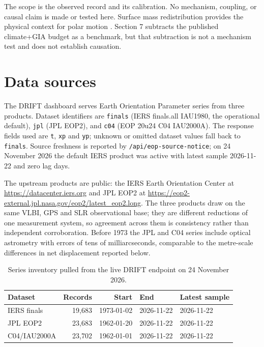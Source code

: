 \documentclass[11pt,a4paper]{article}
\begin{document}
The scope is the observed record and its calibration. No mechanism, coupling, or causal claim is made or tested here. Surface mass redistribution provides the physical context for polar motion \cite{adhikari}. Section 7 subtracts the published climate+GIA budget as a benchmark, but that subtraction is not a mechanism test and does not establish causation.

\section{Data sources}

The DRIFT dashboard serves Earth Orientation Parameter series from three products. Dataset identifiers are \texttt{finals} (IERS finals.all IAU1980, the operational default), \texttt{jpl} (JPL EOP2), and \texttt{c04} (EOP 20u24 C04 IAU2000A). The response fields used are \texttt{t}, \texttt{xp} and \texttt{yp}; unknown or omitted dataset values fall back to \texttt{finals}. Source freshness is reported by \texttt{/api/eop-source-notice}; on 24 November 2026 the default IERS product was active with latest sample 2026-11-22 and zero lag days.

{\sloppy
The upstream products are public: the IERS Earth Orientation Center at \url{https://datacenter.iers.org} and JPL EOP2 at \url{https://eop2-external.jpl.nasa.gov/eop2/latest_eop2.long}. The three products draw on the same VLBI, GPS and SLR observational base; they are different reductions of one measurement system, so agreement across them is consistency rather than independent corroboration. Before 1973 the JPL and C04 series include optical astrometry with errors of tens of milliarcseconds, comparable to the metre-scale differences in net displacement reported below.
\par}

\begin{table}[ht]
\centering
\caption{Series inventory pulled from the live DRIFT endpoint on 24 November 2026.}
\label{tab:inventory}
\begin{tabular}{lrrll}
\toprule
Dataset & Records & Start & End & Latest sample \\
\midrule
IERS finals & 19{,}683 & 1973-01-02 & 2026-11-22 & 2026-11-22 \\
JPL EOP2 & 23{,}683 & 1962-01-20 & 2026-11-22 & 2026-11-22 \\
C04/IAU2000A & 23{,}702 & 1962-01-01 & 2026-11-22 & 2026-11-22 \\
\bottomrule
\end{tabular}
\end{table}
\end{document}
